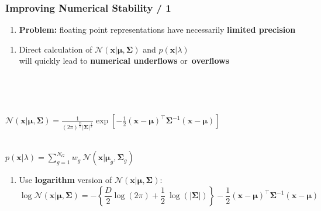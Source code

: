 \documentclass[usenames,dvipsnames]{beamer}
\def\Vec#1{{\boldsymbol{#1}}}
\def\Mat#1{{\boldsymbol{#1}}}
\begin{document}
\begin{frame}
\frametitle{Improving Numerical Stability / 1}

\begin{enumerate}[{~~$\boldsymbol{\bullet}$}]

\item {\bf Problem:} floating point representations have necessarily {\bf limited precision}

\end{enumerate}

\begin{minipage}{1\textwidth}
\begin{minipage}{0.5\textwidth}
\begin{enumerate}[{~~$\boldsymbol{\bullet}$}]
\item Direct calculation of ${{\mathcal{N}}}( \Vec{x} | \Vec{\mu}, \Mat{\Sigma} )$ and $p(\Vec{x} | \lambda)$\\
will quickly lead to {\bf numerical underflows} or~{\bf overflows}
\end{enumerate}
\end{minipage}
\vline~
\begin{minipage}{0.45\textwidth}
~\\
\begin{tiny}
${{\mathcal{N}}}( \Vec{x} | \Vec{\mu}, \Mat{\Sigma} ) = \frac{1}{ (2\pi)^{\frac{D}{2}} | \Mat{\Sigma}|^{\frac{1}{2}} } \exp \left[ -\frac{1}{2} (\Vec{x}-\Vec{\mu})^\top \Mat{\Sigma}^{-1} (\Vec{x}-\Vec{\mu}) \right]$\\
\end{tiny}
~\\
$p(\Vec{x} | \lambda) = \sum\nolimits_{g=1}^{N_G} w_g ~ {{\mathcal{N}}}( \Vec{x} | \Vec{\mu}_g, \Mat{\Sigma}_g )$\\
\end{minipage}

\end{minipage}

\begin{enumerate}[{~~$\boldsymbol{\bullet}$}]

\item Use {\bf logarithm} version of ${{\mathcal{N}}}( \Vec{x} | \Vec{\mu}, \Mat{\Sigma} )$:
%
\begin{equation*}
  \log {{\mathcal{N}}}( \Vec{x} | \Vec{\mu}, \Mat{\Sigma} )
  = -\left\{\frac{D}{2} \log \left( 2\pi \right) + \frac{1}{2} ~ \log ( |\Mat{\Sigma}| ) \right\}
    -\frac{1}{2} (\Vec{x}-\Vec{\mu})^\top \Mat{\Sigma}^{-1} (\Vec{x}-\Vec{\mu})
\end{equation*}


\end{enumerate}
\end{frame}
\end{document}
